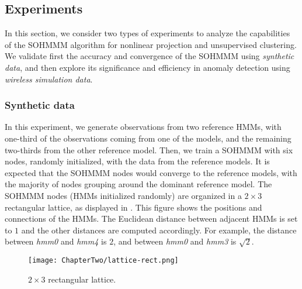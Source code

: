 \subsection{Experiments}
\label{sec:sohmmm_experiments}
In this section, we consider two types of experiments to analyze the capabilities of the SOHMMM algorithm for nonlinear projection and unsupervised clustering. We validate first the accuracy and convergence of the SOHMMM using \textit{synthetic data}, and then explore its significance and efficiency in anomaly detection using \textit{wireless simulation data}.

\subsubsection{Synthetic data}
\label{sec:sohmmm_experiment_synth}

In this experiment, we generate observations from two reference HMMs, with one-third of the observations coming from one of the models, and the remaining two-thirds from the other reference model. Then, we train a SOHMMM with six nodes, randomly initialized, with the data from the reference models. It is expected that the SOHMMM nodes would converge to the reference models, with the majority of nodes grouping around the dominant reference model. The SOHMMM nodes (HMMs initialized randomly) are organized in a $2 \times 3$ rectangular lattice, as displayed in . This figure shows the positions and connections of the HMMs. The Euclidean distance between adjacent HMMs is set to $1$ and the other distances are computed accordingly. For example, the distance between \textit{hmm0} and \textit{hmm4} is $2$, and between \textit{hmm0} and \textit{hmm3} is $\sqrt{2}$.

\begin{figure}[h]
    \centering
    \texttt{[image: ChapterTwo/lattice-rect.png]}
    \caption{$2 \times 3$ rectangular lattice.}
    \label{fig:sohmmm_lattice}
\end{figure}

